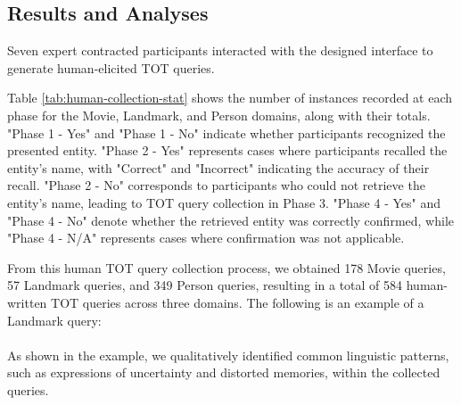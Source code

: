 \subsection{Results and Analyses}


Seven expert contracted participants interacted with the designed interface to generate human-elicited TOT queries.


Table \ref{tab:human-collection-stat} shows the number of instances recorded at each phase for the Movie, Landmark, and Person domains, along with their totals.
"Phase 1 - Yes" and "Phase 1 - No" indicate whether participants recognized the presented entity. "Phase 2 - Yes" represents cases where participants recalled the entity's name, with "Correct" and "Incorrect" indicating the accuracy of their recall. "Phase 2 - No" corresponds to participants who could not retrieve the entity's name, leading to TOT query collection in Phase 3. "Phase 4 - Yes" and "Phase 4 - No" denote whether the retrieved entity was correctly confirmed, while "Phase 4 - N/A" represents cases where confirmation was not applicable.

From this human TOT query collection process, we obtained 178 Movie queries, 57 Landmark queries, and 349 Person queries, resulting in a total of 584 human-written TOT queries across three domains. 
The following is an example of a Landmark query:\\

\noindent{}\\

\noindent
As shown in the example, we qualitatively identified common linguistic patterns, such as expressions of uncertainty and distorted memories, within the collected queries.




